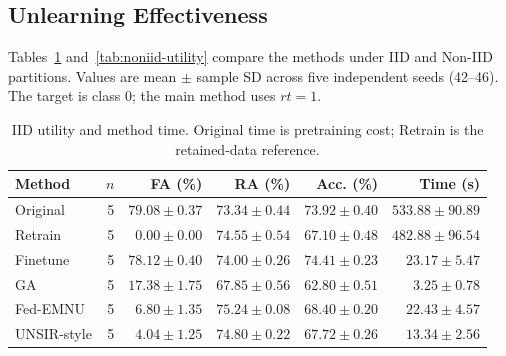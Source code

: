 \subsection{Unlearning Effectiveness}
\label{sec:effectiveness}
Tables~\ref{tab:iid-utility} and~\ref{tab:noniid-utility} compare the methods
under IID and Non-IID partitions. Values are mean $\pm$ sample SD across five
independent seeds (42--46). The target is class 0; the main method uses $rt=1$.
\begin{table}[H]\centering\small
\caption{IID utility and method time. Original time is pretraining cost; Retrain is the retained-data reference.}
\label{tab:iid-utility}
\begin{tabular}{lrrrrr}\toprule Method & $n$ & FA (\%) & RA (\%) & Acc. (\%) & Time (s)\\\midrule
Original & 5 & $79.08 \pm 0.37$ & $73.34 \pm 0.44$ & $73.92 \pm 0.40$ & $533.88 \pm 90.89$\\
Retrain & 5 & $0.00 \pm 0.00$ & $74.55 \pm 0.54$ & $67.10 \pm 0.48$ & $482.88 \pm 96.54$\\
Finetune & 5 & $78.12 \pm 0.40$ & $74.00 \pm 0.26$ & $74.41 \pm 0.23$ & $23.17 \pm 5.47$\\
GA & 5 & $17.38 \pm 1.75$ & $67.85 \pm 0.56$ & $62.80 \pm 0.51$ & $3.25 \pm 0.78$\\
Fed-EMNU & 5 & $6.80 \pm 1.35$ & $75.24 \pm 0.08$ & $68.40 \pm 0.20$ & $22.43 \pm 4.57$\\
UNSIR-style & 5 & $4.04 \pm 1.25$ & $74.80 \pm 0.22$ & $67.72 \pm 0.26$ & $13.34 \pm 2.56$\\
\bottomrule\end{tabular}\end{table}


